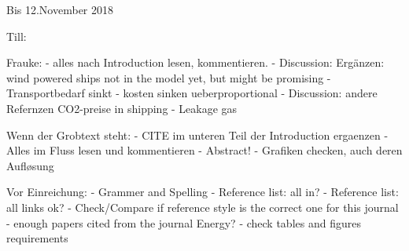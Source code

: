 Bis 12.November 2018

Till:

Frauke:
- alles nach Introduction lesen, kommentieren.
- Discussion: Ergänzen: wind powered ships not in the model yet, but might be promising
- Transportbedarf sinkt - kosten sinken ueberproportional
- Discussion: andere Refernzen CO2-preise in shipping
- Leakage gas

Wenn der Grobtext steht:
- CITE im unteren Teil der Introduction ergaenzen
- Alles im Fluss lesen und kommentieren
- Abstract!
- Grafiken checken, auch deren Aufløsung


Vor Einreichung:
- Grammer and Spelling
- Reference list: all in?
- Reference list: all links ok?
- Check/Compare if reference style is the correct one for this journal
- enough papers cited from the journal Energy?
- check tables and figures requirements

